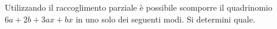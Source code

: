 Utilizzando il raccoglimento parziale è possibile scomporre il quadrinomio  
$6a + 2b + 3ax + bx$
in uno solo dei seguenti modi. 
Si determini quale.
